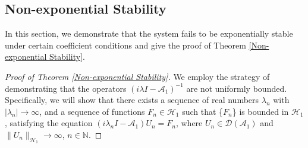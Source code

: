 \documentclass[11pt,reqno]{article}
\begin{document}
  \subsection{Non-exponential Stability}\label{sec2.3}
  In this section, we demonstrate that the system fails to be exponentially stable under certain coefficient conditions and give the proof of Theorem \ref{Non-exponential Stability}.
  \begin{proof}[Proof of Theorem \ref{Non-exponential Stability}]
  We employ the strategy of demonstrating that the operators $(i\lambda I-\mathcal{A}_1)^{-1}$ are not uniformly bounded. Specifically, we will show that there exists a sequence of real numbers $\lambda_n$ with $|\lambda_n| \to \infty$, and a sequence of functions $F_n \in \mathcal{H}_1$ such that \{$F_n$\} is bounded in $\mathcal{H}_1$, satisfying the equation $(i\lambda_n I-\mathcal{A}_1)U_n = F_n$, where $U_n \in \mathcal{D}(\mathcal{A}_1)$ and $\|U_n\|_{\mathcal{H}_1} \to \infty$, $n \in \mathbb{N}$.
  	

\end{proof}
\end{document}
